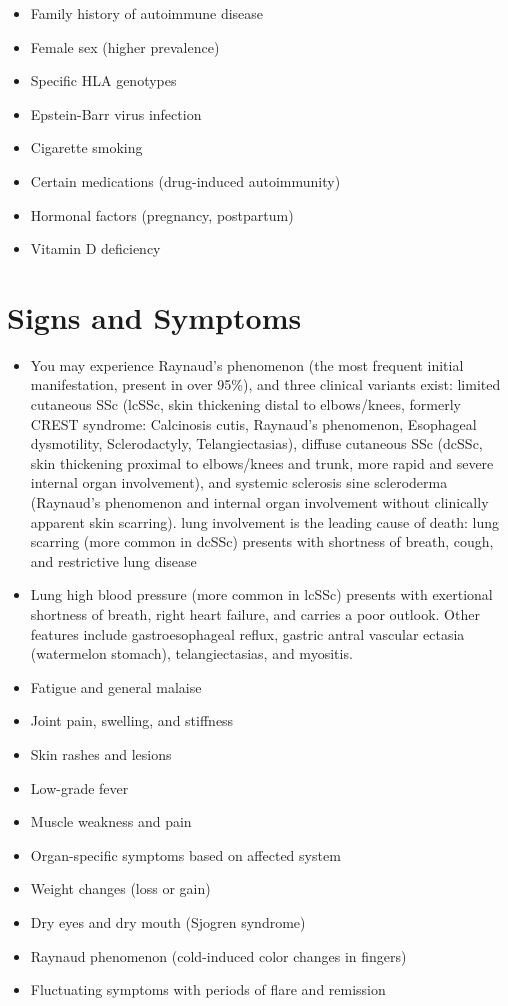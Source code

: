 \begin{itemize}[noitemsep]
  \item Family history of autoimmune disease
  \item Female sex (higher prevalence)
  \item Specific HLA genotypes
  \item Epstein-Barr virus infection
  \item Cigarette smoking
  \item Certain medications (drug-induced autoimmunity)
  \item Hormonal factors (pregnancy, postpartum)
  \item Vitamin D deficiency
\end{itemize}
\section{Signs and Symptoms}
\begin{itemize}[noitemsep]
  \item You may experience Raynaud's phenomenon (the most frequent initial manifestation, present in over 95\%), and three clinical variants exist: limited cutaneous SSc (lcSSc, skin thickening distal to elbows/knees, formerly CREST syndrome: Calcinosis cutis, Raynaud's phenomenon, Esophageal dysmotility, Sclerodactyly, Telangiectasias), diffuse cutaneous SSc (dcSSc, skin thickening proximal to elbows/knees and trunk, more rapid and severe internal organ involvement), and systemic sclerosis sine scleroderma (Raynaud's phenomenon and internal organ involvement without clinically apparent skin scarring). lung involvement is the leading cause of death: lung scarring (more common in dcSSc) presents with shortness of breath, cough, and restrictive lung disease
  \item Lung high blood pressure (more common in lcSSc) presents with exertional shortness of breath, right heart failure, and carries a poor outlook. Other features include gastroesophageal reflux, gastric antral vascular ectasia (watermelon stomach), telangiectasias, and myositis.
  \item Fatigue and general malaise
  \item Joint pain, swelling, and stiffness
  \item Skin rashes and lesions
  \item Low-grade fever
  \item Muscle weakness and pain
  \item Organ-specific symptoms based on affected system
  \item Weight changes (loss or gain)
  \item Dry eyes and dry mouth (Sjogren syndrome)
  \item Raynaud phenomenon (cold-induced color changes in fingers)
  \item Fluctuating symptoms with periods of flare and remission
\end{itemize}
